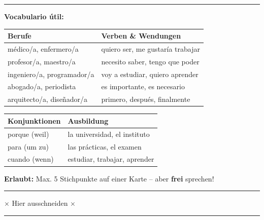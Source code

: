\documentclass[11pt, a4paper]{article}
\begin{document}
\begin{center}
{\begin{minipage}{0.95\textwidth}
\vspace{0.5cm}
\hrule
\vspace{0.5cm}

{\Large\bfseries Vocabulario útil:}

\vspace{0.3cm}

\begin{tabularx}{\textwidth}{@{}|X|X|@{}}
\hline
\rowcolor{gruppeB!10}
\textbf{Berufe} & \textbf{Verben \& Wendungen} \\
\hline
médico/a, enfermero/a & quiero ser, me gustaría trabajar \\
profesor/a, maestro/a & necesito saber, tengo que poder \\
ingeniero/a, programador/a & voy a estudiar, quiero aprender \\
abogado/a, periodista & es importante, es necesario \\
arquitecto/a, diseñador/a & primero, después, finalmente \\
\hline
\end{tabularx}

\vspace{0.3cm}

\begin{tabularx}{\textwidth}{@{}|X|X|@{}}
\hline
\rowcolor{gruppeB!10}
\textbf{Konjunktionen} & \textbf{Ausbildung} \\
\hline
porque (weil) & la universidad, el instituto \\
para (um zu) & las prácticas, el examen \\
cuando (wenn) & estudiar, trabajar, aprender \\
\hline
\end{tabularx}

\vspace{0.5cm}

\begin{center}
\colorbox{gruppeB!20}{\parbox{0.9\textwidth}{\centering
\textbf{Erlaubt:} Max. 5 Stichpunkte auf einer Karte -- aber \textbf{frei} sprechen!
}}
\end{center}

\vspace{0.3cm}
\end{minipage}%
}
\end{center}

\vspace{1cm}

\noindent\rule{\textwidth}{0.5pt}
\begin{center}
\scriptsize\textcolor{grau}{$\times$ Hier ausschneiden $\times$}
\end{center}
\rule{\textwidth}{0.5pt}
\end{document}
